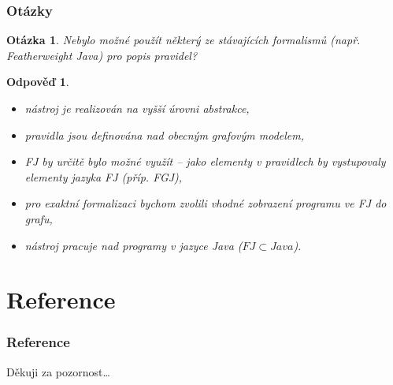 \documentclass{beamer}
\newtheorem*{question}{Otázka}
\newtheorem*{response}{Odpověď}
\begin{document}
\begin{frame}
  \frametitle{Otázky}
  \begin{question}
    Nebylo možné použít některý ze stávajících formalismů (např. Featherweight Java) pro popis pravidel?
  \end{question}
  \begin{response}
    \begin{itemize}
    \item nástroj je realizován na vyšší úrovni abstrakce,
    \item pravidla jsou definována nad obecným grafovým modelem,
    \item FJ by určitě bylo možné využít -- jako elementy v pravidlech by vystupovaly elementy jazyka FJ (příp. FGJ),
    \item pro exaktní formalizaci bychom zvolili vhodné zobrazení programu ve FJ do grafu,
    \item nástroj pracuje nad programy v jazyce Java ($FJ \subset Java$).
    \end{itemize}
  \end{response}
\end{frame}

\section*{Reference}
\begin{frame}
  \frametitle{Reference}
   {
    \def\CS{$\cal C\kern-0.1667em\lower.5ex\hbox{$\cal S$}\kern-0.075em $}
    
  }
\end{frame}

\begin{frame}
  \begin{center}
    {\huge Děkuji za pozornost\ldots}
  \end{center}
\end{frame}
\end{document}

